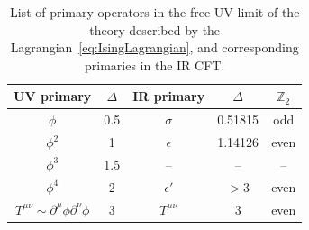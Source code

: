 \documentclass[a4paper,12pt]{article}
\numberwithin{equation}{section}
\begin{document}
\begin{table}
	\centering
	\begin{tabular}{|c|c||c|c||c|}
		\hline
		UV primary & $\Delta$ & IR primary
		& $\Delta$ & $\mathbb{Z}_2$
		\\ \hline
		$\phi$ & 0.5 & $\sigma$ & 0.51815 & odd
		\\
		$\phi^2$ & 1 & $\epsilon$ & 1.14126 & even
		\\
		$\phi^3$ & 1.5 & -- & -- & --
		\\
		$\phi^4$ & 2 & $\epsilon'$ & $> 3$ & even
		\\
		\hline
		$T^{\mu\nu} \sim \partial^\mu \phi \partial^\nu \phi$ & 3 &
		$T^{\mu\nu}$ & 3 & even
		\\
		\hline
	\end{tabular}
	\caption{List of primary operators in the free UV limit of the
	theory described by the Lagrangian~\eqref{eq:IsingLagrangian},
	and corresponding primaries in the IR CFT.}
	\label{tab:Isingops}
\end{table}





\end{document}
